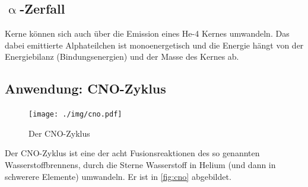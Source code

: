 \subsection{$\upalpha$-Zerfall}
Kerne können sich auch über die Emission eines He-4 Kernes umwandeln.
Das dabei emittierte Alphateilchen ist monoenergetisch und die Energie hängt von der Energiebilanz (Bindungsenergien) und der Masse des Kernes ab.

\subsection{Anwendung: CNO-Zyklus}
\begin{figure}
	\centering
	\texttt{[image: ./img/cno.pdf]}
	\caption{Der CNO-Zyklus}
	\label{fig:cno}
\end{figure}
Der CNO-Zyklus ist eine der acht Fusionsreaktionen des so genannten Wasserstoffbrennens, durch die Sterne Wasserstoff in Helium (und dann in schwerere Elemente) umwandeln.
Er ist in \autoref{fig:cno} abgebildet.
